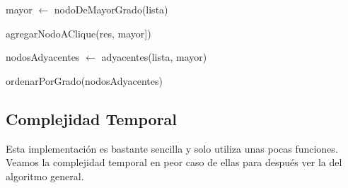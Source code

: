 \begin{algorithm}[H]
	\NoCaptionOfAlgo
	\caption{}

    mayor $\leftarrow$ nodoDeMayorGrado(lista)

    agregarNodoAClique(res, mayor])

    nodosAdyacentes $\leftarrow$ adyacentes(lista, mayor)

    ordenarPorGrado(nodosAdyacentes)

\end{algorithm}

\subsection{Complejidad Temporal}

Esta implementación es bastante sencilla y solo utiliza unas pocas funciones. Veamos la complejidad temporal en peor caso de ellas para después ver la del algoritmo general.

